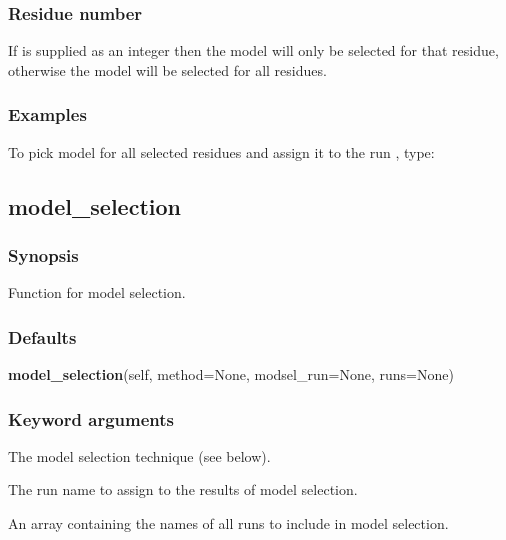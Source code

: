   
 \subsubsection{Residue number} 

 If  is supplied as an integer then the model will only be selected for that residue, otherwise the model will be selected for all residues. 
  

  
 \subsubsection{Examples} 

 To pick model  for all selected residues and assign it to the run , type: 
  



  

 \newpage 

 \subsection{model\_selection} 

  
 \subsubsection{Synopsis} 

 Function for model selection. 
  

  
 \subsubsection{Defaults} 

 \textsf{\textbf{model\_selection}(self, method=None, modsel\_run=None, runs=None)} 

  
 \subsubsection{Keyword arguments} 

   The model selection technique (see below).   

   The run name to assign to the results of model selection.   

   An array containing the names of all runs to include in model selection.  


